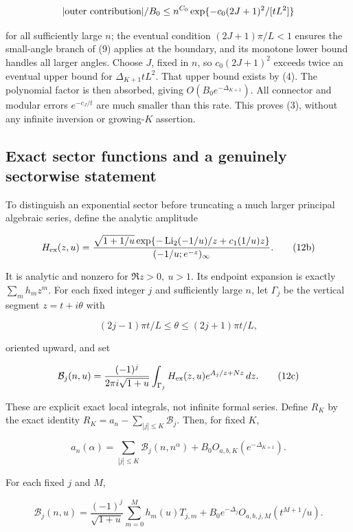 \documentclass[11pt,letterpaper]{article}
\begin{document}
\[
 |\hbox{outer contribution}|/B_0
 \le n^{C_0}\exp\{-c_0(2J+1)^2/[tL^2]\}
\]

for all sufficiently large \(n\); the eventual condition
\((2J+1)\pi/L<1\) ensures the small-angle branch of (9) applies at the
boundary, and its monotone lower bound handles all larger angles. Choose
\(J\), fixed in \(n\), so \(c_0(2J+1)^2\) exceeds twice an eventual
upper bound for \(\Delta_{K+1}tL^2\). That upper bound exists by (4).
The polynomial factor is then absorbed, giving
\(O(B_0e^{-\Delta_{K+1}})\). All connector and modular errors
\(e^{-c_J/t}\) are much smaller than this rate. This proves (3), without
any infinite inversion or growing-\(K\) assertion.

\subsection{Exact sector functions and a genuinely sectorwise
statement}\label{mfp:exact-sector-functions-and-a-genuinely-sectorwise-statement}

To distinguish an exponential sector before truncating a much larger
principal algebraic series, define the analytic amplitude

\[
 H_{\rm ex}(z,u)=\frac{\sqrt{1+1/u}
 \exp\{-\operatorname{Li}_2(-1/u)/z+c_1(1/u)z\}}
 {(-1/u;e^{-z})_\infty}. \tag{12b}
\]

It is analytic and nonzero for \(\Re z>0,\ u>1\). Its endpoint expansion
is exactly \(\sum_mh_mz^m\). For each fixed integer \(j\) and
sufficiently large \(n\), let \(\Gamma_j\) be the vertical segment
\(z=t+i\theta\) with

\[
 (2j-1)\pi t/L\le\theta\le(2j+1)\pi t/L,
\]

oriented upward, and set

\[
 \mathcal B_j(n,u)=\frac{(-1)^j}{2\pi i\sqrt{1+u}}
 \int_{\Gamma_j} H_{\rm ex}(z,u)e^{A_j/z+Nz}\,dz. \tag{12c}
\]

These are explicit exact local integrals, not infinite formal series.
Define \(R_K\) by the exact identity
\(R_K=a_n-\sum_{|j|\le K}\mathcal B_j\). Then, for fixed \(K\),

\[
 a_n(\alpha)=\sum_{|j|\le K}\mathcal B_j(n,n^\alpha)
 +B_0 O_{a,b,K}(e^{-\Delta_{K+1}}). \tag{12d}
\]

For each fixed \(j\) and \(M\),

\[
 \mathcal B_j(n,u)=\frac{(-1)^j}{\sqrt{1+u}}
 \sum_{m=0}^{M}h_m(u)T_{j,m}
 +B_0e^{-\Delta_j}O_{a,b,j,M}(t^{M+1}/u). \tag{12e}
\]
\end{document}
